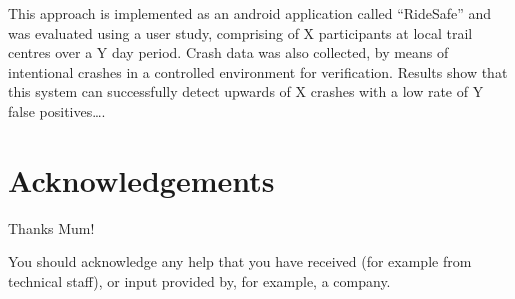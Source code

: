 \documentclass[a4paper,oneside,12pt]{book}
\begin{document}
This approach is implemented as an android application called “RideSafe” and was evaluated using a user study, comprising of X participants at local trail centres over a Y day period. Crash data was also collected, by means of intentional crashes in a controlled environment  for verification.  Results show that this system can successfully detect upwards of X crashes with a low rate of Y false positives….


\newpage
\onehalfspacing\raggedright %

\section*{\Huge{Acknowledgements}}
Thanks Mum!

You should acknowledge any help that you have received (for example from technical staff), or input provided by, for example, a company.
\tableofcontents
\newpage


\mainmatter






\appendix
\renewcommand{\thechapter}{A\arabic{chapter}}

\end{document}
